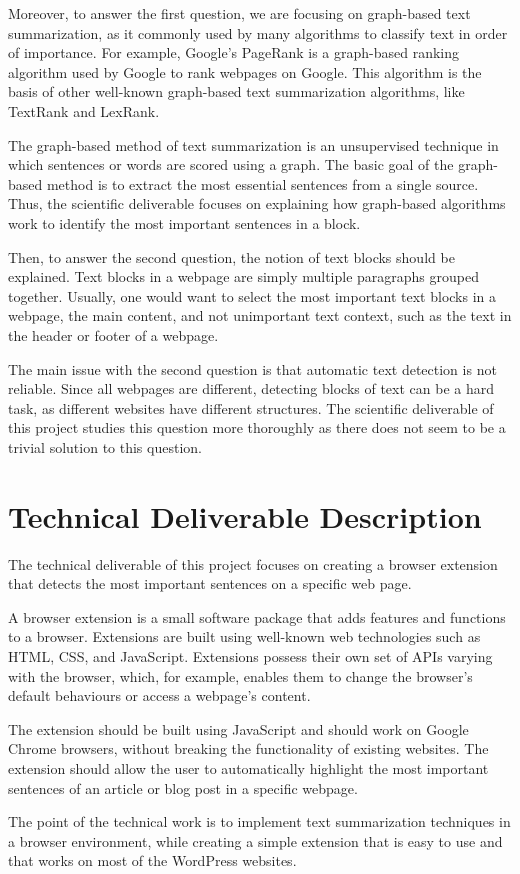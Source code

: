 \documentclass[conference,compsoc]{IEEEtran}
\begin{document}
Moreover, to answer the first question, we are focusing on graph-based text summarization, as it commonly used by many algorithms to classify text in order of importance. For example, Google's PageRank is a graph-based ranking algorithm used by Google to rank webpages on Google. This algorithm is the basis of other well-known graph-based text summarization algorithms, like TextRank and LexRank.

The graph-based method of text summarization is an unsupervised technique in which sentences or words are scored using a graph. The basic goal of the graph-based method is to extract the most essential sentences from a single source. Thus, the scientific deliverable focuses on explaining how graph-based algorithms work to identify the most important sentences in a block. 

Then, to answer the second question, the notion of text blocks should be explained. Text blocks in a webpage are simply multiple paragraphs grouped together. Usually, one would want to select the most important text blocks in a webpage, the main content, and not unimportant text context, such as the text in the header or footer of a webpage.

The main issue with the second question is that automatic text detection is not reliable. Since all webpages are different, detecting blocks of text can be a hard task, as different websites have different structures. The scientific deliverable of this project studies this question more thoroughly as there does not seem to be a trivial solution to this question.


\section{Technical Deliverable Description}

The technical deliverable of this project focuses on creating a browser extension that detects the most important sentences on a specific web page. 

A browser extension is a small software package that adds features and functions to a browser. Extensions are built using well-known web technologies such as HTML, CSS, and JavaScript. Extensions possess their own set of APIs varying with the browser, which, for example, enables them to change the browser's default behaviours or access a webpage's content.

The extension should be built using JavaScript and should work on Google Chrome browsers, without breaking the functionality of existing websites. The extension should allow the user to automatically highlight the most important sentences of an article or blog post in a specific webpage. 

The point of the technical work is to implement text summarization techniques in a browser environment, while creating a simple extension that is easy to use and that works on most of the WordPress websites.


\nocite{bics-bsp-reference-document}
\nocite{bics-bsp-report-template}



\end{document}

